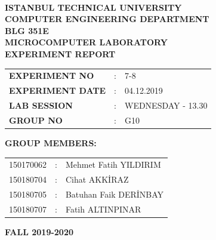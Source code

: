 \documentclass[pdftex,12pt,a4paper]{article}
\begin{document}
\begin{titlepage}
\begin{center}
\textbf{}\\
\textbf{\Large{ISTANBUL TECHNICAL UNIVERSITY}}\\
\vspace{0.5cm}
\textbf{\Large{COMPUTER ENGINEERING DEPARTMENT}}\\
\vspace{2cm}
\textbf{\Large{BLG 351E\\ MICROCOMPUTER LABORATORY\\ EXPERIMENT REPORT}}\\
\vspace{2.8cm}
\begin{table}[ht]
\centering
\Large{
\begin{tabular}{lcl}
\textbf{EXPERIMENT NO}  & : & 7-8 \\
\textbf{EXPERIMENT DATE}  & : & 04.12.2019 \\
\textbf{LAB SESSION}  & : & WEDNESDAY - 13.30 \\
\textbf{GROUP NO}  & : & G10 \\
\end{tabular}}
\end{table}
\vspace{1cm}
\textbf{\Large{GROUP MEMBERS:}}\\
\begin{table}[ht]
\centering
\Large{
\begin{tabular}{rcl}
150170062  & : & Mehmet Fatih YILDIRIM \\
150180704  & : & Cihat AKK\.{I}RAZ \\
150180705  & : & Batuhan Faik DER\.{I}NBAY \\
150180707  & : & Fatih ALTINPINAR \\
\end{tabular}}
\end{table}
\vspace{2.8cm}
\textbf{\Large{FALL 2019-2020}}

\end{center}

\end{titlepage}

\newpage


\thispagestyle{empty}
\setcounter{tocdepth}{4}
\tableofcontents
\clearpage

\setcounter{page}{1}
\end{document}
